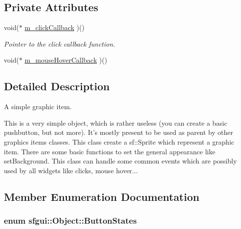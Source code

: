 \subsection*{Private Attributes}
\begin{CompactItemize}
\item 
void($\ast$ \hyperlink{classsfgui_1_1Object_5917de9750aa3c8d282899ee83f835b4}{m\_\-clickCallback} )()
\begin{CompactList}\small\item\em Pointer to the click callback function. \item\end{CompactList}\item 
void($\ast$ \hyperlink{classsfgui_1_1Object_ddff61a2d47a7b25e05aa5b6311417ea}{m\_\-mouseHoverCallback} )()
\end{CompactItemize}


\subsection{Detailed Description}
A simple graphic item. 

This is a very simple object, which is rather useless (you can create a basic pushbutton, but not more). It's mostly present to be used as parent by other graphics items classes. This class create a sf::Sprite which represent a graphic item. There are some basic functions to set the general appearance like setBackground. This class can handle some common events which are possibly used by all widgets like clicks, mouse hover... 

\subsection{Member Enumeration Documentation}
\hypertarget{classsfgui_1_1Object_8a7d7ae20a88b7ef8a104f7e6c8596ce}{
\subsubsection[ButtonStates]{\setlength{\rightskip}{0pt plus 5cm}enum {\bf sfgui::Object::ButtonStates}}}
\label{classsfgui_1_1Object_8a7d7ae20a88b7ef8a104f7e6c8596ce}


